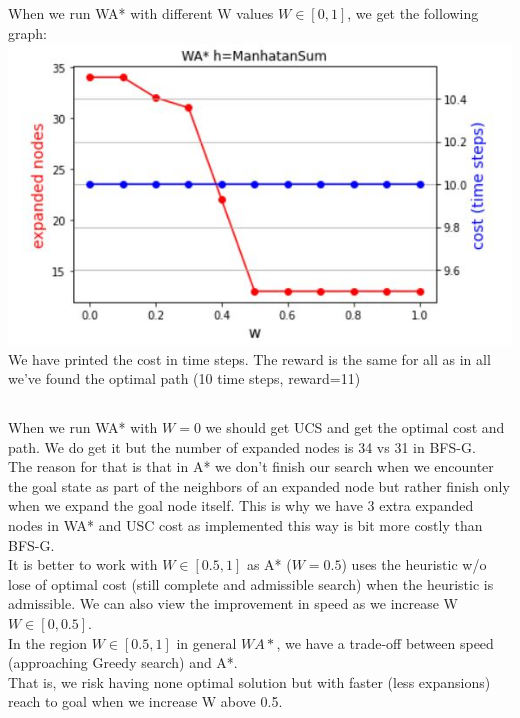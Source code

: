 \documentclass[12pt]{article}
\begin{document}
\subsection{}

When we run WA* with different W values $W\in[0,1]$, we get the following graph:\\
\includegraphics[scale=1]{w_graph.JPG}\\

We have printed the cost in time steps. The reward is the same for all as in all we've found the optimal path (10 time steps, reward=11)

\subsection{}

When we run WA* with $W=0$ we should get UCS and get the optimal cost and path. We do get it but the number of expanded nodes is 34 vs 31 in BFS-G.\\

The reason for that is that in A* we don't finish our search when we encounter the goal state as part of the neighbors of an expanded node but rather finish only when we expand the goal node itself. This is why we have 3 extra expanded nodes in WA* and USC cost as implemented this way is bit more costly than BFS-G.\\

It is better to work with $W\in[0.5,1]$ as A* ($W=0.5$) uses the heuristic w/o lose of optimal cost (still complete and admissible search) when the heuristic is admissible. We can also view the improvement in speed as we increase W $W\in[0,0.5]$.\\

In the region $W\in[0.5,1]$ in general $WA*$, we have a trade-off between speed (approaching Greedy search) and A*.\\ That is, we risk having none optimal solution but with faster (less expansions) reach to goal when we increase W above 0.5.\\
\end{document}
